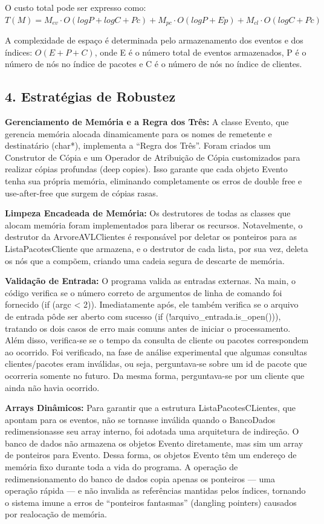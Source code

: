 \documentclass[
  12pt,
]{article}
\begin{document}
O custo total pode ser expresso como:
\(T(M)=M_{ev} \cdot O(logP+logC+Pc) + M_{pc} \cdot O(logP+Ep) + M_{cl} \cdot O(logC+Pc)\)

A complexidade de espaço é determinada pelo armazenamento dos eventos e
dos índices: \(O(E+P+C)\), onde E é o número total de eventos
armazenados, P é o número de nós no índice de pacotes e C é o número de
nós no índice de clientes.

\subsection{4. Estratégias de
Robustez}\label{estratuxe9gias-de-robustez}

\textbf{Gerenciamento de Memória e a Regra dos Três:} A classe Evento,
que gerencia memória alocada dinamicamente para os nomes de remetente e
destinatário (char*), implementa a ``Regra dos Três''. Foram criados um
Construtor de Cópia e um Operador de Atribuição de Cópia customizados
para realizar cópias profundas (deep copies). Isso garante que cada
objeto Evento tenha sua própria memória, eliminando completamente os
erros de double free e use-after-free que surgem de cópias rasas.

\textbf{Limpeza Encadeada de Memória:} Os destrutores de todas as
classes que alocam memória foram implementados para liberar os recursos.
Notavelmente, o destrutor da ArvoreAVLClientes é responsável por deletar
os ponteiros para as ListaPacotesCliente que armazena, e o destrutor de
cada lista, por sua vez, deleta os nós que a compõem, criando uma cadeia
segura de descarte de memória.

\textbf{Validação de Entrada:} O programa valida as entradas externas.
Na main, o código verifica se o número correto de argumentos de linha de
comando foi fornecido (if (argc \textless{} 2)). Imediatamente após, ele
também verifica se o arquivo de entrada pôde ser aberto com sucesso (if
(!arquivo\_entrada.is\_open())), tratando os dois casos de erro mais
comuns antes de iniciar o processamento. Além disso, verifica-se se o
tempo da consulta de cliente ou pacotes correspondem ao ocorrido. Foi
verificado, na fase de análise experimental que algumas consultas
clientes/pacotes eram inválidas, ou seja, perguntava-se sobre um id de
pacote que ocorreria somente no futuro. Da mesma forma, perguntava-se
por um cliente que ainda não havia ocorrido.

\textbf{Arrays Dinâmicos:} Para garantir que a estrutura
ListaPacotesCLientes, que apontam para os eventos, não se tornasse
inválida quando o BancoDados redimensionasse seu array interno, foi
adotada uma arquitetura de indireção. O banco de dados não armazena os
objetos Evento diretamente, mas sim um array de ponteiros para Evento.
Dessa forma, os objetos Evento têm um endereço de memória fixo durante
toda a vida do programa. A operação de redimensionamento do banco de
dados copia apenas os ponteiros --- uma operação rápida --- e não
invalida as referências mantidas pelos índices, tornando o sistema imune
a erros de ``ponteiros fantasmas'' (dangling pointers) causados por
realocação de memória.
\end{document}
